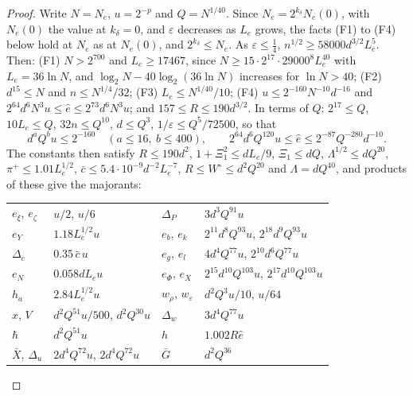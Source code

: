 \documentclass[11pt]{amsart}
\theoremstyle{definition}
\numberwithin{equation}{section}
\begin{document}
\begin{proof}
Write $N=N_e$, $u=2^{-p}$ and $Q=N^{1/40}$. Since $N_e=2^{k_\delta}N_e(0)$, with $N_e(0)$ the value at $k_\delta=0$, and $\varepsilon$ decreases as $L_e$ grows, the facts (F1) to (F4) below hold at $N_e$ as at $N_e(0)$, and $2^{k_\delta}\le N_e$. As $\varepsilon\le\frac14$, $n^{1/2}\ge58000d^{3/2}L_e^5$. Then: (F1) $N>2^{700}$ and $L_e\ge17467$, since $N\ge15\cdot2^{17}\cdot29000^8L_e^{40}$ with $L_e=36\ln N$, and $\log_2N-40\log_2(36\ln N)$ increases for $\ln N>40$; (F2) $d^{15}\le N$ and $n\le N^{1/4}/32$; (F3) $L_e\le N^{1/40}/10$; (F4) $u\le2^{-160}N^{-10}d^{-16}$ and $2^{64}d^6N^3u\le\hat e\le2^{73}d^6N^3u$; and $157\le R\le190d^{3/2}$. In terms of $Q$: $2^{17}\le Q$, $10L_e\le Q$, $32n\le Q^{10}$, $d\le Q^3$, $1/\varepsilon\le Q^5/72500$, so that
\[
d^aQ^bu\le2^{-160}\quad(a\le16,\ b\le400),\qquad 2^{64}d^6Q^{120}u\le\hat e\le2^{-87}Q^{-280}d^{-10}.
\]
The constants then satisfy $R\le190d^2$, $1+\Xi_1^2\le dL_e/9$, $\Xi_1\le dQ$, $\Lambda^{1/2}\le dQ^{20}$, $\pi^+\le1.01L_e^{1/2}$, $\bar c\le5.4\cdot10^{-9}d^{-2}L_e^{-7}$, $R\le W^\circ\le d^2Q^{20}$ and $\Lambda=dQ^{40}$, and products of these give the majorants:
\begin{center}
\begin{tabular}{ll|ll}
$e_\xi$, $e_\zeta$ & $u/2$, $u/6$ & $\Delta_P$ & $3d^3Q^{91}u$\\
$e_Y$ & $1.18L_e^{1/2}u$ & $e_b$, $e_k$ & $2^{11}d^8Q^{93}u$, $2^{18}d^9Q^{93}u$\\
$\Delta_c$ & $0.35\,\bar c\,u$ & $e_g$, $e_l$ & $4d^4Q^{77}u$, $2^{10}d^6Q^{77}u$\\
$e_N$ & $0.058dL_eu$ & $e_\Phi$, $e_X$ & $2^{15}d^{10}Q^{103}u$, $2^{17}d^{10}Q^{103}u$\\
$h_a$ & $2.84L_e^{1/2}u$ & $w_\rho$, $w_\varepsilon$ & $d^2Q^3u/10$, $u/64$\\
$x$, $V$ & $d^2Q^{51}u/500$, $d^2Q^{30}u$ & $\Delta_w$ & $3d^4Q^{77}u$\\
$\hbar$ & $d^2Q^{51}u$ & $h$ & $1.002R\hat e$\\
$\bar X$, $\Delta_u$ & $2d^4Q^{72}u$, $2d^4Q^{72}u$ & $\bar G$ & $d^2Q^{36}$
\end{tabular}
\end{center}

\end{proof}
\end{document}
